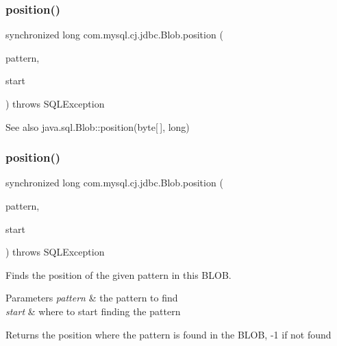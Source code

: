 \subsubsection{\texorpdfstring{position()}{position()}\hspace{0.1cm}{\footnotesize\ttfamily [1/2]}}
{\footnotesize\ttfamily synchronized long com.\+mysql.\+cj.\+jdbc.\+Blob.\+position (\begin{DoxyParamCaption}\item[{byte \mbox{[}$\,$\mbox{]}}]{pattern,  }\item[{long}]{start }\end{DoxyParamCaption}) throws S\+Q\+L\+Exception}

\begin{DoxySeeAlso}{See also}
java.\+sql.\+Blob\+::position(byte\mbox{[}$\,$\mbox{]}, long) 
\end{DoxySeeAlso}
\mbox{\label{classcom_1_1mysql_1_1cj_1_1jdbc_1_1_blob_ae44b30a5b6688e357cdb7cd4c459e20e}} 
\subsubsection{\texorpdfstring{position()}{position()}\hspace{0.1cm}{\footnotesize\ttfamily [2/2]}}
{\footnotesize\ttfamily synchronized long com.\+mysql.\+cj.\+jdbc.\+Blob.\+position (\begin{DoxyParamCaption}\item[{java.\+sql.\+Blob}]{pattern,  }\item[{long}]{start }\end{DoxyParamCaption}) throws S\+Q\+L\+Exception}

Finds the position of the given pattern in this B\+L\+OB.


\begin{DoxyParams}{Parameters}
{\em pattern} & the pattern to find \\
\hline
{\em start} & where to start finding the pattern\\
\hline
\end{DoxyParams}
\begin{DoxyReturn}{Returns}
the position where the pattern is found in the B\+L\+OB, -\/1 if not found
\end{DoxyReturn}

